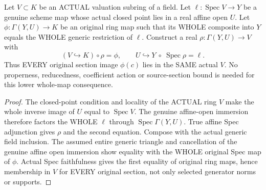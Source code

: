 \begin{lemma}
\label{scheme:actual-affine-valuation-section-factor}
\leanok
Let $V\subset K$ be an ACTUAL valuation subring of a field.  Let
$\ell:\operatorname{Spec}V\to Y$ be a genuine scheme map whose actual closed
point lies in a real affine open $U$.  Let
$\phi:\Gamma(Y,U)\to K$ be an original ring map such that its WHOLE composite
into $Y$ equals the WHOLE generic restriction of $\ell$.  Construct a real
$\rho:\Gamma(Y,U)\to V$ with
\[
 (V\hookrightarrow K)\circ\rho=\phi,
 \qquad U\hookrightarrow Y\ \circ\ \operatorname{Spec}\rho=\ell.
\]
Thus EVERY original section image $\phi(c)$ lies in the SAME actual $V$.
No properness, reducedness, coefficient action or source-section bound is
needed for this lower whole-map consequence.
\end{lemma}
\begin{proof}
The closed-point condition and locality of the ACTUAL ring $V$ make the
whole inverse image of $U$ equal to $\operatorname{Spec}V$.  The genuine
affine-open immersion therefore factors the WHOLE $\ell$ through
$\operatorname{Spec}\Gamma(Y,U)$.  True affine Spec adjunction gives $\rho$
and the second equation.  Compose with the actual generic field inclusion.
The assumed entire generic triangle and cancellation of the genuine affine
open immersion show equality with the WHOLE original Spec map of $\phi$.
Actual Spec faithfulness gives the first equality of original ring maps,
hence membership in $V$ for EVERY original section, not only selected
generator norms or supports.
\end{proof}
